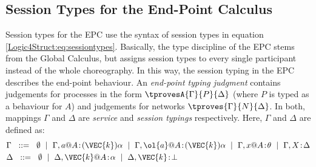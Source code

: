 \subsection{Session Types for the End-Point Calculus}
\label{Logic4Struct-EndPointTypes}
Session types for the EPC use the syntax of session types in
equation \ref{Logic4Struct:eq:sessiontypes}. Basically, the type
discipline of the EPC stems from the Global Calculus, but assigns
session types to every single participant instead of the whole
choreography. In this way, the session typing in the EPC describes the
end-point behaviour.
  An {\it end-point typing judgment} contains judgements for processes in  the form $\tprovesA{\Gamma}{P}{\Delta}$ (where $P$ is
    typed as a behaviour for $A$) and judgements for networks
    $\tproves{\Gamma}{N}{\Delta}$. In both,  mappings $\Gamma$ and $\Delta$ are {\em service} and {\em session typings} respectively.
Here, $\Gamma$ 
 and $\Delta$ 
are defined
as:
\begin{align*}
&\Gamma  \ \; ::=\;\ \emptyset
                  \;\ |\;\ \Gamma, a@A\!:\!(\VEC{k})\alpha
                  \;\ |\;\ \Gamma, \ol{a}@A\!:\!(\VEC{k})\alpha
                  \;\ |\;\ \Gamma, x@A\!:\!\theta
                  \;\ |\;\ \Gamma, X\!:\!\Delta
\\
&\Delta  \ \; ::=\;\ \emptyset
              \;\ |\;\ \Delta, \VEC{k}@A\!:\!\alpha
              \;\ |\;\ \Delta, \VEC{k}\!:\!\bot
\end{align*}

